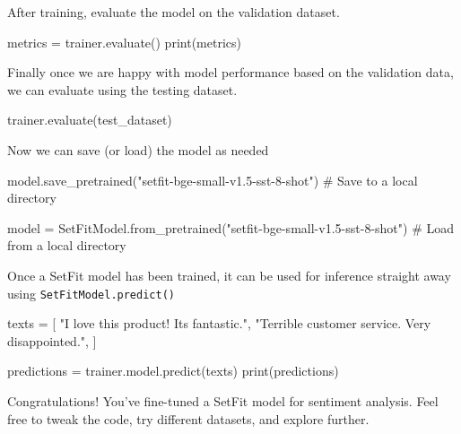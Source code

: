 \documentclass[
  letterpaper,
  DIV=11,
  numbers=noendperiod]{scrreprt}
\newenvironment{Shaded}{\begin{snugshade}}{\end{snugshade}}
\newcommand{\BuiltInTok}[1]{\textcolor[rgb]{0.00,0.23,0.31}{#1}}
\newcommand{\CommentTok}[1]{\textcolor[rgb]{0.37,0.37,0.37}{#1}}
\newcommand{\NormalTok}[1]{\textcolor[rgb]{0.00,0.23,0.31}{#1}}
\newcommand{\OperatorTok}[1]{\textcolor[rgb]{0.37,0.37,0.37}{#1}}
\newcommand{\StringTok}[1]{\textcolor[rgb]{0.13,0.47,0.30}{#1}}
\begin{document}
After training, evaluate the model on the validation dataset.

\begin{Shaded}
\begin{Highlighting}[]
\NormalTok{metrics }\OperatorTok{=}\NormalTok{ trainer.evaluate()}
\BuiltInTok{print}\NormalTok{(metrics)}
\end{Highlighting}
\end{Shaded}

Finally once we are happy with model performance based on the validation
data, we can evaluate using the testing dataset.

\begin{Shaded}
\begin{Highlighting}[]
\NormalTok{trainer.evaluate(test\_dataset)}
\end{Highlighting}
\end{Shaded}

Now we can save (or load) the model as needed

\begin{Shaded}
\begin{Highlighting}[]
\NormalTok{model.save\_pretrained(}\StringTok{"setfit{-}bge{-}small{-}v1.5{-}sst{-}8{-}shot"}\NormalTok{) }\CommentTok{\# Save to a local directory}

\NormalTok{model }\OperatorTok{=}\NormalTok{ SetFitModel.from\_pretrained(}\StringTok{"setfit{-}bge{-}small{-}v1.5{-}sst{-}8{-}shot"}\NormalTok{) }\CommentTok{\# Load from a local directory}
\end{Highlighting}
\end{Shaded}

Once a SetFit model has been trained, it can be used for inference
straight away using \texttt{SetFitModel.predict()}

\begin{Shaded}
\begin{Highlighting}[]
\NormalTok{texts }\OperatorTok{=}\NormalTok{ [}
    \StringTok{"I love this product! It\textquotesingle{}s fantastic."}\NormalTok{,}
    \StringTok{"Terrible customer service. Very disappointed."}\NormalTok{,}
\NormalTok{]}

\NormalTok{predictions }\OperatorTok{=}\NormalTok{ trainer.model.predict(texts)}
\BuiltInTok{print}\NormalTok{(predictions)}
\end{Highlighting}
\end{Shaded}

Congratulations! You've fine-tuned a SetFit model for sentiment
analysis. Feel free to tweak the code, try different datasets, and
explore further.
\end{document}
